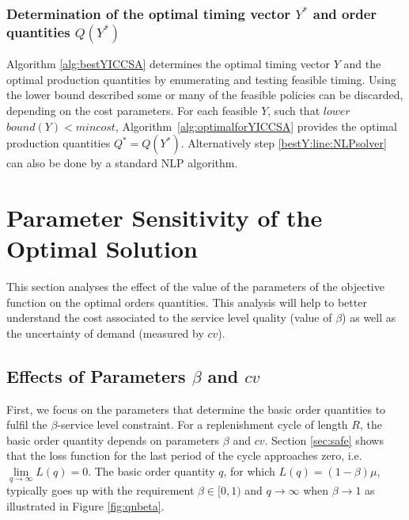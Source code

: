 \subsubsection{Determination of the optimal timing vector $Y^*$ and order quantities $Q(Y^*)$}
Algorithm \ref{alg:bestYICCSA} determines the optimal timing vector $Y$ and the optimal production quantities by enumerating and testing feasible timing. Using the lower bound described some or many of the feasible policies can be discarded, depending on the cost parameters. For each feasible $Y$, such that  $lower$ $bound(Y) < mincost$, Algorithm~\ref{alg:optimalforYICCSA}  provides the  optimal production quantities $Q^*=Q(Y^*)$. Alternatively step \ref{bestY:line:NLPsolver} can also be done by a standard NLP algorithm.


{


\section{Parameter Sensitivity of the Optimal Solution}
\label{sec:parameters}
This section analyses the effect of the value of the parameters of the objective function on the optimal orders quantities. This analysis will help to better understand the cost associated to the service level quality  (value of $\beta$) as well as the uncertainty of demand (measured by $cv$).

\subsection{Effects of Parameters $\beta$ and $cv$}
First, we focus on the parameters that determine the basic order quantities to fulfil the $\beta$-service level  constraint. For a replenishment cycle of length $R$, the basic order quantity depends on parameters $\beta$ and $cv$. Section \ref{sec:safe} shows that the loss function for the last period of the cycle approaches zero, i.e. $\lim \limits_{q \to \infty}L(q)=0$. The basic order quantity $q$, for which $L(q)=(1-\beta)\mu$, typically goes up with the requirement $\beta \in [0,1)$ and ${q}\rightarrow \infty$ when $\beta \rightarrow 1$ as illustrated in Figure \ref{fig:qnbeta}.


}
